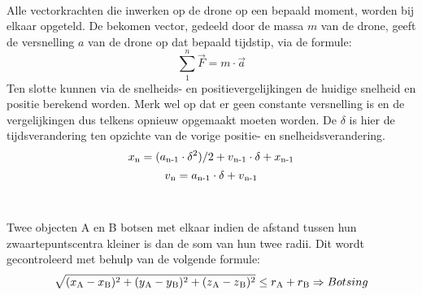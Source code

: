 \\
Alle vectorkrachten die inwerken op de drone op een bepaald moment, worden bij elkaar opgeteld. De bekomen vector, gedeeld door de massa \(m\) van de drone, geeft de versnelling \(a\) van de drone op dat bepaald tijdstip, via de formule:
\\
\begin{equation*}
\sum_{1}^{n} \vec{F} = m \cdot \vec{a} \label{krachtenevenwicht}
\end{equation*}
Ten slotte kunnen via de snelheids- en positievergelijkingen de huidige snelheid en positie berekend worden. Merk wel op dat er geen constante versnelling is en de vergelijkingen dus telkens opnieuw opgemaakt moeten worden. De \(\delta\) is hier de tijdsverandering ten opzichte van de vorige positie- en snelheidsverandering.
\\
\begin{equation*}
x\textsubscript{n} = (a\textsubscript{n-1} \cdot \delta\textsuperscript{2})/2 + v\textsubscript{n-1} \cdot \delta + x\textsubscript{n-1} \label{positie}
\end{equation*}
\begin{equation*}
v\textsubscript{n} = a\textsubscript{n-1} \cdot \delta + v\textsubscript{n-1} \label{snelheid}
\end{equation*}
\\
\\
Twee objecten A en B botsen met elkaar indien de afstand tussen hun zwaartepuntscentra kleiner is dan de som van hun twee radii. Dit wordt gecontroleerd met behulp van de volgende formule:
\begin{equation*}
\sqrt{(x\textsubscript{A}-x\textsubscript{B})\textsuperscript{2} + (y\textsubscript{A} - y\textsubscript{B})\textsuperscript{2} + (z\textsubscript{A} - z\textsubscript{B})\textsuperscript{2}}  \le r\textsubscript{A} + r\textsubscript{B} \Rightarrow Botsing
\end{equation*}
\\
\\
